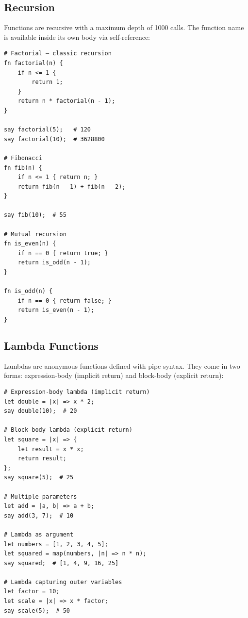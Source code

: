 \subsection{Recursion}

Functions are recursive with a maximum depth of 1000 calls. The function name is available inside its own body via self-reference:

\begin{tcolorbox}[colback=codebg, colframe=darkpurple, colbacktitle=darkpurple, title=\textbf{\textcolor{codegold}{Recursion}}, fonttitle=\bfseries, sharp corners]
\begin{lstlisting}
# Factorial — classic recursion
fn factorial(n) {
    if n <= 1 {
        return 1;
    }
    return n * factorial(n - 1);
}

say factorial(5);   # 120
say factorial(10);  # 3628800

# Fibonacci
fn fib(n) {
    if n <= 1 { return n; }
    return fib(n - 1) + fib(n - 2);
}

say fib(10);  # 55

# Mutual recursion
fn is_even(n) {
    if n == 0 { return true; }
    return is_odd(n - 1);
}

fn is_odd(n) {
    if n == 0 { return false; }
    return is_even(n - 1);
}
\end{lstlisting}
\end{tcolorbox}

\subsection{Lambda Functions}

Lambdas are anonymous functions defined with pipe syntax. They come in two forms: expression-body (implicit return) and block-body (explicit return):

\begin{tcolorbox}[colback=codebg, colframe=darkpurple, colbacktitle=darkpurple, title=\textbf{\textcolor{codegold}{Lambda Functions}}, fonttitle=\bfseries, sharp corners]
\begin{lstlisting}
# Expression-body lambda (implicit return)
let double = |x| => x * 2;
say double(10);  # 20

# Block-body lambda (explicit return)
let square = |x| => {
    let result = x * x;
    return result;
};
say square(5);  # 25

# Multiple parameters
let add = |a, b| => a + b;
say add(3, 7);  # 10

# Lambda as argument
let numbers = [1, 2, 3, 4, 5];
let squared = map(numbers, |n| => n * n);
say squared;  # [1, 4, 9, 16, 25]

# Lambda capturing outer variables
let factor = 10;
let scale = |x| => x * factor;
say scale(5);  # 50
\end{lstlisting}
\end{tcolorbox}

